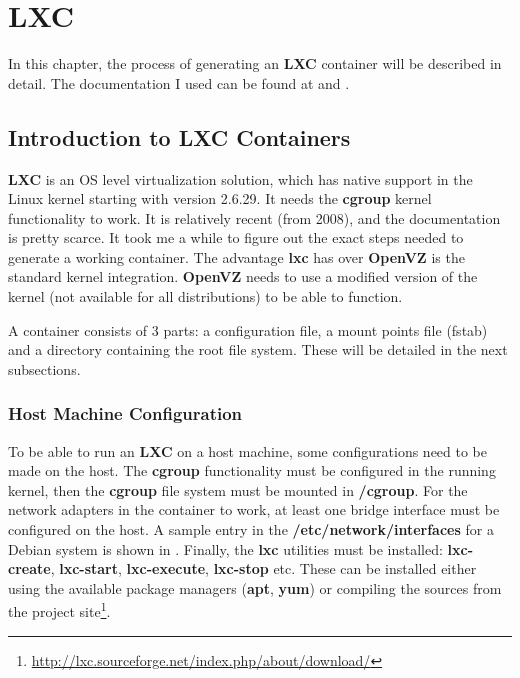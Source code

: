 \chapter{LXC}
\label{chapter:lxc}

In this chapter, the process of generating an \textbf{LXC} container will be
described in detail. The documentation I used can be found at \cite{lxc-teegra}
and \cite{lxc-zen}.

\section{Introduction to LXC Containers}
\label{sec:lxc-intro}
\textbf{LXC} is an OS level virtualization solution, which has native support
in the Linux kernel starting with version 2.6.29. It needs the \textbf{cgroup}
kernel functionality to work. It is relatively recent (from 2008), and the
documentation is pretty scarce. It took me a while to figure out the exact
steps needed to generate a working container. The advantage \textbf{lxc} has
over \textbf{OpenVZ} is the standard kernel integration. \textbf{OpenVZ} needs
to use a modified version of the kernel (not available for all distributions)
to be able to function.

A container consists of 3 parts: a configuration file, a mount points file
(fstab) and a directory containing the root file system. These will be detailed
in the next subsections.

\subsection{Host Machine Configuration}
\label{sub-sec:lxc-host-config}
To be able to run an \textbf{LXC} on a host machine, some configurations need
to be made on the host. The \textbf{cgroup} functionality must be configured in
the running kernel, then the \textbf{cgroup} file system must be mounted in
\textbf{/cgroup}. For the network adapters in the container to work, at least
one bridge interface must be configured on the host. A sample entry in the
\mbox{\textbf{/etc/network/interfaces}} for a Debian system is shown in
. Finally, the \textbf{lxc}
utilities must be installed: \textbf{lxc-create}, \textbf{lxc-start},
\textbf{lxc-execute}, \textbf{lxc-stop} etc. These can be installed either
using the available package managers (\textbf{apt}, \textbf{yum}) or compiling
the sources from the project
site\footnote{\url{http://lxc.sourceforge.net/index.php/about/download/}}.

